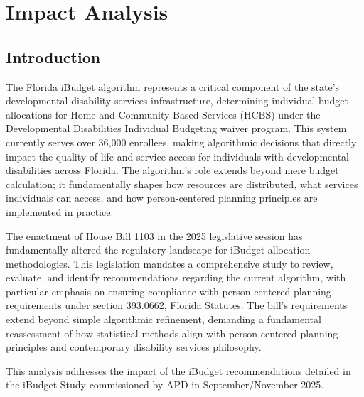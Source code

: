 ﻿\chapter{Impact Analysis}\newpage

\section{Introduction}

The Florida iBudget algorithm represents a critical component of the state's developmental disability services infrastructure, determining individual budget allocations for Home and Community-Based Services (HCBS) under the Developmental Disabilities Individual Budgeting waiver program. This system currently serves over 36,000 enrollees, making algorithmic decisions that directly impact the quality of life and service access for individuals with developmental disabilities across Florida. The algorithm's role extends beyond mere budget calculation; it fundamentally shapes how resources are distributed, what services individuals can access, and how person-centered planning principles are implemented in practice.

The enactment of House Bill 1103 in the 2025 legislative session has fundamentally altered the regulatory landscape for iBudget allocation methodologies. This legislation mandates a comprehensive study to review, evaluate, and identify recommendations regarding the current algorithm, with particular emphasis on ensuring compliance with person-centered planning requirements under section 393.0662, Florida Statutes. The bill's requirements extend beyond simple algorithmic refinement, demanding a fundamental reassessment of how statistical methods align with person-centered planning principles and contemporary disability services philosophy.

This analysis addresses the impact of the iBudget recommendations detailed in the iBudget Study commissioned by APD in September/November 2025. 

